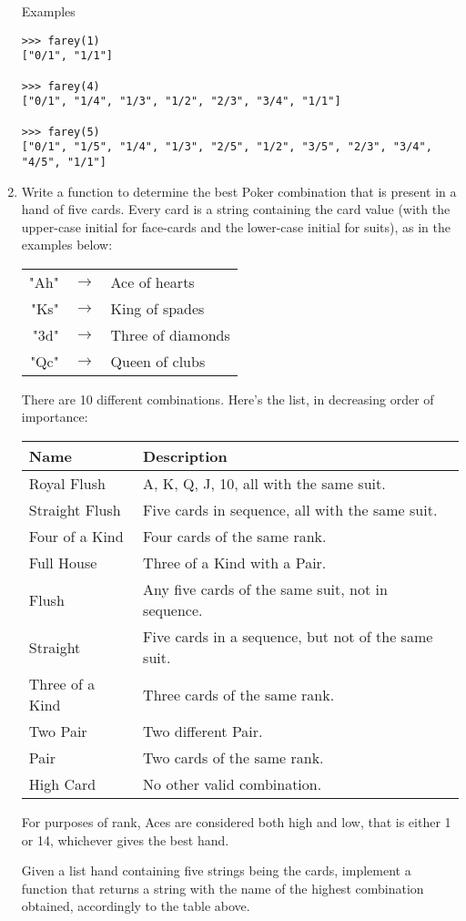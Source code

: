 \documentclass{article}
\newcommand{\li}{\item}
\begin{document}
\begin{enumerate}
Examples
\begin{lstlisting}
>>> farey(1) 
["0/1", "1/1"]

>>> farey(4) 
["0/1", "1/4", "1/3", "1/2", "2/3", "3/4", "1/1"]

>>> farey(5)  
["0/1", "1/5", "1/4", "1/3", "2/5", "1/2", "3/5", "2/3", "3/4", "4/5", "1/1"]
\end{lstlisting}

\li
Write a function to determine the best Poker combination that is present in a hand
of five cards. 
Every card is a string containing the card value
(with the upper-case initial for face-cards
and the lower-case initial for suits), as in the examples below:

\begin{tabular}{rcl}
"Ah" &$\rightarrow$& Ace of hearts\\
"Ks" &$\rightarrow$&  King of spades\\
"3d" &$\rightarrow$&  Three of diamonds\\
"Qc" &$\rightarrow$&  Queen of clubs
\end{tabular}

There are 10 different combinations. Here's the list, in decreasing order of importance:

\begin{tabular}{ll}
Name	& Description\\\hline
Royal Flush	& 	A, K, Q, J, 10, all with the same suit.\\
Straight Flush	& 	Five cards in sequence, all with the same suit.\\
Four of a Kind	& 	Four cards of the same rank.\\
Full House		& Three of a Kind with a Pair.\\
Flush		& Any five cards of the same suit, not in sequence.\\
Straight	& 	Five cards in a sequence, but not of the same suit.\\
Three of a Kind	& 	Three cards of the same rank.\\
Two Pair		& Two different Pair.\\
Pair	& 	Two cards of the same rank.\\
High Card		& No other valid combination.
\end{tabular}

For purposes of rank, Aces are considered both high and low, that is
either 1 or 14, whichever gives the best hand.

Given a list hand containing five strings being the cards, 
implement a function that returns a string with the name 
of the highest combination obtained, accordingly to the table above.


\end{enumerate}
\end{document}
